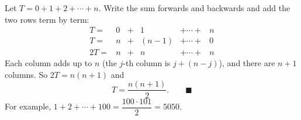 Let $T=0+1+2+\cdots+n$. Write the sum forwards and backwards and add the two rows term by term:
\[
\begin{array}{rcccccc}
T=&0&+&1&+\cdots+&n\\
T=&n&+&(n-1)&+\cdots+&0\\\hline
2T=&n&+&n&+\cdots+&n
\end{array}
\]
Each column adds up to $n$ (the $j$-th column is $j+(n-j)$), and there are $n+1$ columns. So $2T=n(n+1)$ and
\[
T=\dfrac{n(n+1)}{2}. \qquad\blacksquare
\]
For example, $1+2+\cdots+100=\dfrac{100\cdot101}{2}=5050$.
